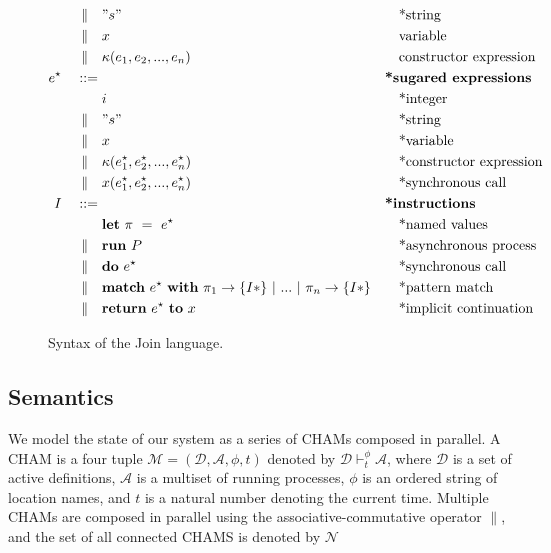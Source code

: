 \begin{figure}
\begin{align*}
\mid\kern-1pt\mid\quad& " s "         && \quad\textrm{*string} \\
\mid\kern-1pt\mid\quad& x               && \quad\textrm{variable} \\
\mid\kern-1pt\mid\quad& \kappa(e_1, e_2, ..., e_n)
                           && \quad\textrm{constructor expression} \\
e^\star\quad ::={}&         && \textbf{*sugared expressions} \\
         & i               && \quad\textrm{*integer} \\
\mid\kern-1pt\mid\quad& " s "         && \quad\textrm{*string} \\
\mid\kern-1pt\mid\quad& x               && \quad\textrm{*variable} \\
\mid\kern-1pt\mid\quad& \kappa(e^\star_1, e^\star_2, ..., e^\star_n)
                           && \quad\textrm{*constructor expression} \\
\mid\kern-1pt\mid\quad& x(e^\star_1, e^\star_2, ..., e^\star_ n)
                           && \quad\textrm{*synchronous call} \\
I\quad ::={}&              && \textbf{*instructions} \\
         & \mathbf{let}~\pi~=~e^\star
                           && \quad\textrm{*named values} \\
\mid\kern-1pt\mid\quad& \mathbf{run}~P  && \quad\textrm{*asynchronous process} \\
\mid\kern-1pt\mid\quad& \mathbf{do}~e^\star && \quad\textrm{*synchronous call} \\
\mid\kern-1pt\mid\quad& \textbf{match}~e^\star~\textbf{with}~\pi_1
               \rightarrow \{ I* \} ~|~ ... ~|~ \pi_n \rightarrow \{ I* \}
                           && \quad\textrm{*pattern match} \\
\mid\kern-1pt\mid\quad& \textbf{return}~e^\star~\textbf{to}~x
                           && \quad\textrm{*implicit continuation}
\end{align*}
\caption{Syntax of the Join language.\label{fig:syntax}}
\end{figure}


\subsection{Semantics}

We model the state of our system as a series of CHAMs composed in parallel. A
CHAM is a four tuple $\mathcal{M} = (\mathcal{D}, \mathcal{A}, \phi, t)$
denoted by $\mathcal{D} \vdash^\phi_t \mathcal{A}$, where $\mathcal{D}$ is a
set of active definitions, $\mathcal{A}$ is a multiset of running processes,
$\phi$ is an ordered string of location names, and $t$ is a natural number
denoting the current time. Multiple CHAMs are composed in parallel using the
associative-commutative operator $\parallel$, and the set of all connected
CHAMS is denoted by $\mathcal{N}$

